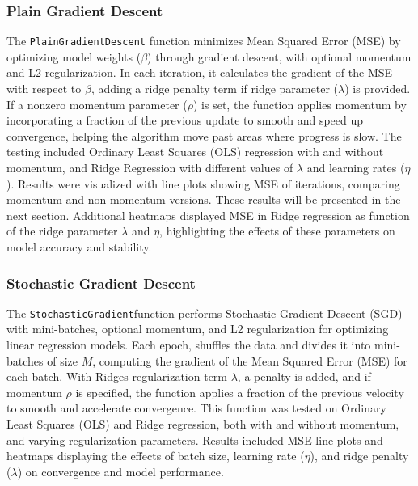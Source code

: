 \documentclass{article}
\newcommand{\0}{\mathbf{0}}
\newcommand{\1}{\mathbf{1}}
\begin{document}
\subsubsection{Plain Gradient Descent}
The \texttt{PlainGradientDescent} function minimizes Mean Squared Error (MSE) by optimizing model weights (\(\beta\)) through gradient descent, with optional momentum and L2 regularization. In each iteration, it calculates the gradient of the MSE with respect to \(\beta\), adding a ridge penalty term if ridge parameter (\(\lambda\)) is provided. If a nonzero momentum parameter (\(\rho\)) is set, the function applies momentum by incorporating a fraction of the previous update to smooth and speed up convergence, helping the algorithm move past areas where progress is slow. The testing included Ordinary Least Squares (OLS) regression with and without momentum, and Ridge Regression with different values of \(\lambda\) and learning rates (\(\eta\)). Results were visualized with line plots showing MSE of iterations, comparing momentum and non-momentum versions. These results will be presented in the next section. Additional heatmaps displayed MSE in Ridge regression as function of the ridge parameter \(\lambda\) and \(\eta\), highlighting the effects of these parameters on model accuracy and stability. 

\subsubsection{Stochastic Gradient Descent}
The \texttt{StochasticGradient}function performs Stochastic Gradient Descent (SGD) with mini-batches, optional momentum, and L2 regularization for optimizing linear regression models. Each epoch, shuffles the data and divides it into mini-batches of size \(M\), computing the gradient of the Mean Squared Error (MSE) for each batch. With Ridges regularization term  \(\lambda\), a penalty is added, and if momentum \(\rho\) is specified, the function applies a fraction of the previous velocity to smooth and accelerate convergence. This function was tested on Ordinary Least Squares (OLS) and Ridge regression, both with and without momentum, and varying regularization parameters. Results included MSE line plots and heatmaps displaying the effects of batch size, learning rate (\(\eta\)), and ridge penalty (\(\lambda\)) on convergence and model performance. 
    
\end{document}
